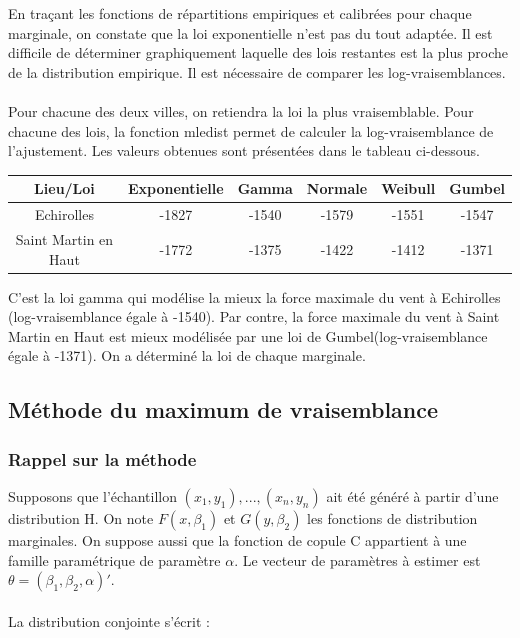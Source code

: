 En traçant les fonctions de répartitions empiriques et calibrées pour chaque marginale, on constate que la loi exponentielle n'est pas du tout adaptée. Il est difficile de déterminer graphiquement laquelle des lois restantes est la plus proche de la distribution empirique. Il est nécessaire de comparer les log-vraisemblances.
\\ \\
Pour chacune des deux villes, on retiendra la loi la plus vraisemblable. Pour chacune des lois, la fonction mledist permet de calculer la log-vraisemblance de l'ajustement. Les valeurs obtenues sont présentées dans le tableau ci-dessous. 
\begin{center}
\begin{tabular}{|c|c|c|c|c|c|}
\hline 
Lieu/Loi & Exponentielle & Gamma & Normale & Weibull & Gumbel \\
\hline
Echirolles & -1827 & -1540 & -1579 & -1551 & -1547 \\
\hline
Saint Martin en Haut & -1772  & -1375 & -1422 & -1412 & -1371 \\
\hline
\end{tabular}
\end{center}

\vspace{0.4cm}
C'est la loi gamma qui modélise la mieux la force maximale du vent à Echirolles (log-vraisemblance égale à -1540). Par contre, la force maximale du vent à Saint Martin en Haut est mieux modélisée par une loi de Gumbel(log-vraisemblance égale à -1371). On a déterminé la loi de chaque marginale.

\subsection{Méthode du maximum de vraisemblance}

\subsubsection{Rappel sur la méthode}

Supposons que l'échantillon $(x_1,y_1),...,(x_n,y_n)$ ait été généré à partir d'une distribution H. On note $F(x,\beta_1)$ et $G(y,\beta_2)$ les fonctions de distribution marginales. On suppose aussi que la fonction de copule C appartient à une famille paramétrique de paramètre $\alpha$. Le vecteur de paramètres à estimer est $\theta = (\beta_1,\beta_2,\alpha)'$. 
\\ \\
La distribution conjointe s'écrit :

